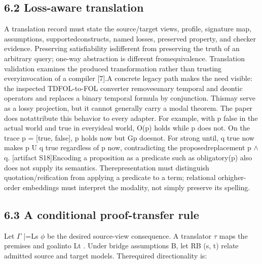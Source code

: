 \subsection*{6.2  Loss-aware translation}
\noindent
A translation record must state the source/target views, profile, signature map, assumptions, supported\linebreak[4]
constructs, named losses, preserved property, and checker evidence. Preserving satisfiability is\linebreak[4]
different from preserving the truth of an arbitrary query; one-way abstraction is different from\linebreak[4]
equivalence. Translation validation examines the produced transformation rather than trusting every\linebreak[4]
invocation of a compiler [7].\linebreak[4]
A concrete legacy path makes the need visible: the inspected TDFOL-to-FOL converter removes\linebreak[4]
unary temporal and deontic operators and replaces a binary temporal formula by conjunction. This\linebreak[4]
may serve as a lossy projection, but it cannot generally carry a modal theorem. The paper does not\linebreak[4]
attribute this behavior to every adapter. For example, with p false in the actual world and true in every\linebreak[4]
ideal world, O(p) holds while p does not. On the trace p = [true, false], p holds now but Gp does\linebreak[4]
not. For strong until, q true now makes p U q true regardless of p now, contradicting the proposed\linebreak[4]
replacement p \ensuremath{\land} q. [artifact S18]\linebreak[4]
Encoding a proposition as a predicate such as obligatory(p) also does not supply its semantics. The\linebreak[4]
representation must distinguish quotation/reification from applying a predicate to a term; relational or\linebreak[4]
higher-order embeddings must interpret the modality, not simply preserve its spelling.\par

\subsection*{6.3  A conditional proof-transfer rule}
\noindent
Let \ensuremath{\Gamma} |=Ls \ensuremath{\phi} be the desired source-view consequence. A translator \ensuremath{\tau} maps the premises and goal\linebreak[4]
into Lt . Under bridge assumptions B, let RB (s, t) relate admitted source and target models. The\linebreak[4]
required directionality is:\par

